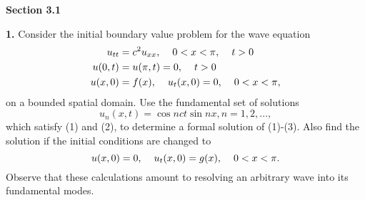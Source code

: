 \documentclass{article}
\begin{document}
\setlength{\parindent}{0cm}   %



\textbf{Section 3.1}

\textbf{1.} Consider the initial boundary value problem for the wave equation
\begin{align}
u_{tt} &= c^2u_{xx}, \hspace{4mm} 0<x<\pi, \hspace{4mm} t>0 \\
u(0,t) &= u(\pi,t)=0, \hspace{4mm} t>0 \\
u(x,0) &= f(x), \hspace{4mm} u_t(x,0)=0, \hspace{4mm} 0<x<\pi,
\end{align}
on a bounded spatial domain. Use the fundamental set of solutions
\[
 u_n(x,t) = \cos nct \sin nx,  n=1,2,\ldots,
\]
which satisfy (1) and (2), to determine a formal solution of (1)-(3). Also find the solution if the initial conditions are changed to 
\[
u(x,0)=0, \hspace{4mm} u_t(x,0)=g(x), \hspace{4mm}0 <x<\pi.
\]
Observe that these calculations amount to resolving an arbitrary wave into its fundamental modes. 
\end{document}

